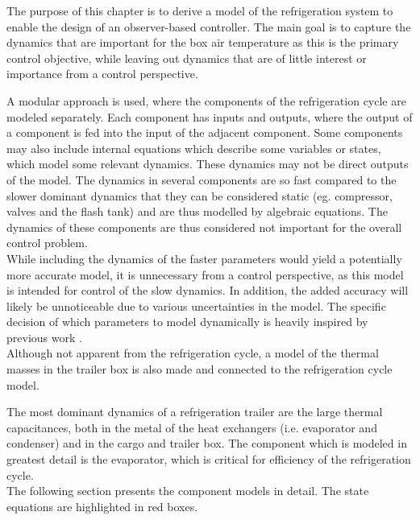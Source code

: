The purpose of this chapter is to derive a model of the refrigeration system to enable the design of an observer-based controller. The main goal is to capture the dynamics that are important for the box air temperature as this is the primary control objective, while leaving out dynamics that are of little interest or importance from a control perspective.

A modular approach is used, where the components of the refrigeration cycle are modeled separately. Each component has inputs and outputs, where the output of a component is fed into the input of the adjacent component. Some components may also include internal equations which describe some variables or states, which model some relevant dynamics. These dynamics may not be direct outputs of the model. The dynamics in several components are so fast compared to the slower dominant dynamics that they can be considered static (eg. compressor, valves and the flash tank) and are thus modelled by algebraic equations. The dynamics of these components are thus considered not important for the overall control problem.\\

While including the dynamics of the faster parameters would yield a potentially more accurate model, it is unnecessary from a control perspective, as this model is intended for control of the slow dynamics. In addition, the added accuracy will likely be unnoticeable due to various uncertainties in the model. The specific decision of which parameters to model dynamically is heavily inspired by previous work \cite{Sorensen2013}.\\


Although not apparent from the refrigeration cycle, a model of the thermal masses in the trailer box is also made and connected to the refrigeration cycle model.

The most dominant dynamics of a refrigeration trailer are the large thermal capacitances, both in the metal of the heat exchangers (i.e. evaporator and condenser) and in the cargo and trailer box. The component which is modeled in greatest detail is the evaporator, which is critical for efficiency of the refrigeration cycle. \\

The following section presents the component models in detail. The state equations are highlighted in red boxes.